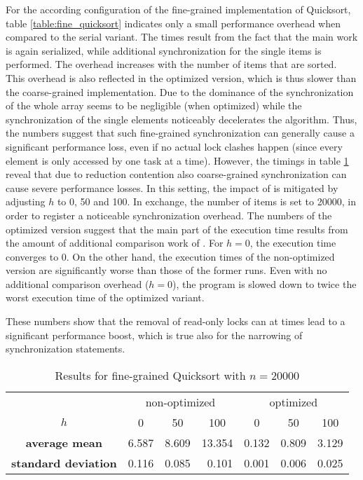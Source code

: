 For the according configuration of the fine-grained implementation of Quicksort, table \ref{table:fine_quicksort} indicates only a small performance overhead when compared to the serial variant. The times result from the fact that the main work is again serialized, while additional synchronization for the single items is performed. The overhead increases with the number of items that are sorted. This overhead is also reflected in the optimized version, which is thus slower than the coarse-grained implementation. Due to the dominance of  the synchronization of the whole array seems to be negligible (when optimized) while the synchronization of the single elements noticeably decelerates the algorithm. Thus, the numbers suggest that such fine-grained synchronization can generally cause a significant performance loss, even if no actual lock clashes happen (since every element is only accessed by one task at a time). However, the timings in table \ref{table:fine_quicksort2} reveal that due to reduction contention also coarse-grained synchronization can cause severe performance losses. In this setting, the impact of  is mitigated by adjusting $h$ to 0, 50 and 100. In exchange, the number of items is set to 20000, in order to register a noticeable synchronization overhead. The numbers of the optimized version suggest that the main part of the execution time results from the amount of additional comparison work of . For $h = 0$, the execution time converges to 0. On the other hand, the execution times of the non-optimized version are significantly worse than those of the former runs. Even with no additional comparison overhead ($h = 0$), the program is slowed down to twice the worst execution time of the optimized variant. 

These numbers show that the removal of read-only locks can at times lead to a significant performance boost, which is true also for the narrowing of synchronization statements.

\begin{table}[h!]
\begin{center}
\begin{tabular}{c |c|c|c||c|c|c|}
  \multicolumn{1}{c}{} & \multicolumn{3}{c}{non-optimized} & \multicolumn{3}{c}{optimized}\\ \cline{2-7}
  $h$ & 0 & 50 & 100 & 0 & 50 & 100\\ \cline{2-7}
  \textbf{average mean} & 6.587 & 8.609 & 13.354 & 0.132 & 0.809 & 3.129	\\ \cline{2-7}
  \textbf{standard deviation} & 0.116 & 0.085 & \multicolumn{1}{r||}{0.101} & 0.001 & 0.006 & 0.025\\ \cline{2-7}
\end{tabular}
\caption{Results for fine-grained Quicksort with $n = 20000$}
\label{table:fine_quicksort2}
\end{center}
\end{table}

